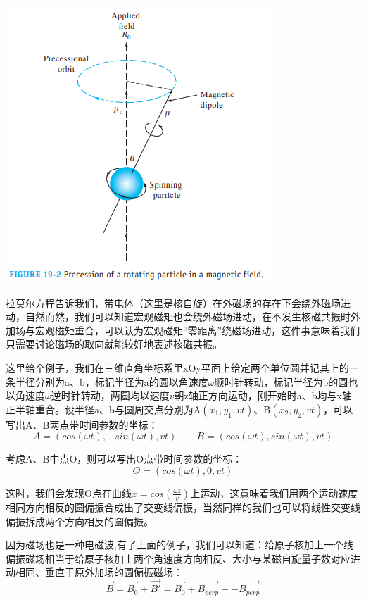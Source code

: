 \begin{center}
\includegraphics[scale=0.6]{./fig/hc/hc2.png}
\end{center}

拉莫尔方程告诉我们，带电体（这里是核自旋）在外磁场的存在下会绕外磁场进动，自然而然，我们可以知道宏观磁矩也会绕外磁场进动，在不发生核磁共振时外加场与宏观磁矩重合，可以认为宏观磁矩“零距离”绕磁场进动，这件事意味着我们只需要讨论磁场的取向就能较好地表述核磁共振。

这里给个例子，我们在三维直角坐标系里xOy平面上给定两个单位圆并记其上的一条半径分别为a、b，标记半径为a的圆以角速度$\omega$顺时针转动，标记半径为b的圆也以角速度$\omega$逆时针转动，两圆均以速度$v$朝z轴正方向运动，刚开始时a、b均与x轴正半轴重合。设半径a、b与圆周交点分别为A$(x_1,y_1,vt)$、B$(x_2,y_2,vt)$，可以写出A、B两点带时间参数的坐标：
\[A=(cos(\omega t),-sin(\omega t),vt) \qquad B=(cos(\omega t),sin(\omega t),vt)\]

考虑A、B中点O，则可以写出O点带时间参数的坐标：
\[O=(cos(\omega t),0,vt)\]

这时，我们会发现O点在曲线$x=cos(\frac{\omega z}{v})$上运动，这意味着我们用两个运动速度相同方向相反的圆偏振合成出了交变线偏振，当然同样的我们也可以将线性交变线偏振拆成两个方向相反的圆偏振。

因为磁场也是一种电磁波,有了上面的例子，我们可以知道：给原子核加上一个线偏振磁场相当于给原子核加上两个角速度方向相反、大小与某磁自旋量子数对应进动相同、垂直于原外加场的圆偏振磁场：
\[\overrightarrow{B}=\overrightarrow{B_0}+\overrightarrow{B'}=\overrightarrow{B_0}+\overrightarrow{B_{perp}}+\overrightarrow{-B_{perp}}\]

